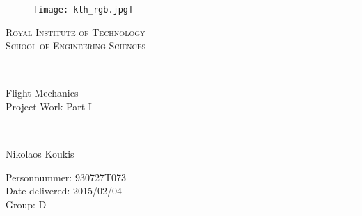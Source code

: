 \newcommand{\horrule}[1]{\rule{\linewidth}{#1}} %

\begin{titlepage}

\begin{center}
\begin{figure}[htpb]
    \begin{center}
        \texttt{[image: kth\_rgb.jpg]} %
    \end{center}
\end{figure}

\normalfont \normalsize 
\textsc{Royal Institute of Technology} \\  %
\textsc{School of Engineering Sciences} \\ [25pt] %
\horrule{0.5pt} \\[0.4cm] %
\huge Flight Mechanics \vspace{5mm}\\ Project Work Part I \\ %
\horrule{2pt} \\[0.5cm] %
\vspace*{10mm}
\LARGE 
Nikolaos Koukis

\vfill
\normalsize \normalfont
Personnummer: 930727T073\\
Date delivered: 2015/02/04\\
Group: D\\
\end{center}
\end{titlepage}
